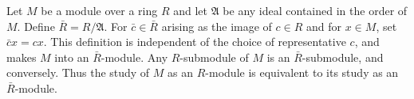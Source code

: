 Let $M$ be a module over a ring $R$ and let $\mathfrak{A}$ be any ideal contained in the order of $M$. Define $\bar{R} = R/\mathfrak{A}$. For $\bar{c} \in \bar{R}$ arising as the image of $c \in R$ and for $x \in M$, set $\bar{c}x = cx$. This definition is independent of the choice of representative $c$, and makes $M$ into an $\bar{R}$-module. Any $R$-submodule of $M$ is an $\bar{R}$-submodule, and conversely. Thus the study of $M$ as an $R$-module is equivalent to its study as an $\bar{R}$-module.
